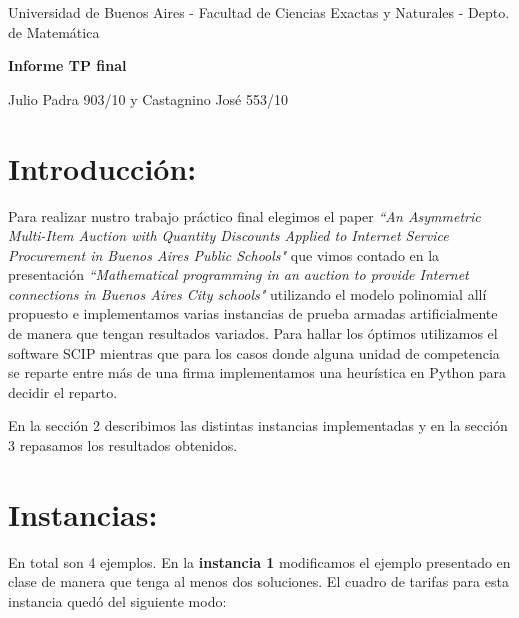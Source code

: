 \documentclass[12pt]{article}
\begin{document}
 \centerline{{\small Universidad de Buenos Aires - Facultad de Ciencias Exactas y Naturales - Depto. de Matem\'atica}}
 
 \vskip 0.2cm
 \hrulefill
 \vskip 0.2cm

 \centerline{{\bf\Huge {\sc Informe TP final}}}
 \vskip 0.2cm
 \centerline{\ttfamily Julio Padra 903/10 y Castagnino Jos\'e 553/10}
 \hrulefill


 \bigskip
 
 
\begin{center}
  \hrulefill

 \end{center}
\section{Introducción:}
Para realizar nustro trabajo práctico final elegimos el paper \textit{``An Asymmetric Multi-Item Auction with Quantity Discounts Applied to Internet Service Procurement in Buenos Aires Public Schools"} que vimos contado en la presentación \textit{``Mathematical programming in an auction to provide Internet connections in Buenos Aires City schools"} utilizando el modelo polinomial allí propuesto e implementamos varias instancias de prueba armadas artificialmente de manera que tengan resultados variados. Para hallar los óptimos utilizamos el software SCIP mientras que para los casos donde alguna unidad de competencia se reparte entre más de una firma implementamos una heurística en Python para decidir el reparto. 

\bigskip
En la sección 2 describimos las distintas instancias implementadas y en la sección 3 repasamos los resultados obtenidos.
    
\bigskip
 \section{Instancias:}
 
    En total son 4 ejemplos. En la \textbf{instancia 1} modificamos el ejemplo presentado en clase de manera que tenga al menos dos soluciones. El cuadro de tarifas para esta instancia quedó del siguiente modo:

\bigskip
\end{document}
